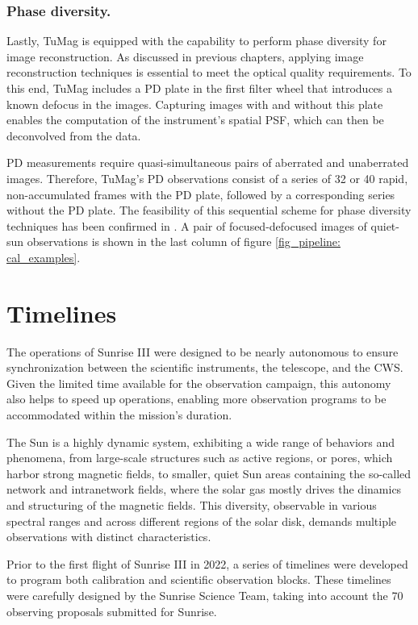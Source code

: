 \subsubsection{\label{susec: PD_measurements}Phase diversity.}

Lastly, TuMag is equipped with the capability to perform phase diversity for image reconstruction. As discussed in previous chapters, applying image reconstruction techniques is essential to meet the optical quality requirements. To this end, TuMag includes a PD plate in the first filter wheel that introduces a known defocus in the images. Capturing images with and without this plate enables the computation of the instrument's spatial PSF, which can then be deconvolved from the data.

PD measurements require quasi-simultaneous pairs of aberrated and unaberrated images. Therefore, TuMag's PD observations consist of a series of 32 or 40 rapid, non-accumulated frames with the PD plate, followed by a corresponding series without the PD plate. The feasibility of this sequential scheme for phase diversity techniques has been confirmed in \cite{PD_sequential}. A pair of focused-defocused images of quiet-sun observations is shown in the last column of figure \ref{fig_pipeline: cal_examples}.

\section{Timelines}

The operations of Sunrise III were designed to be nearly autonomous to ensure synchronization between the scientific instruments, the telescope, and the CWS. Given the limited time available for the observation campaign, this autonomy also helps to speed up operations, enabling more observation programs to be accommodated within the mission's duration.

The Sun is a highly dynamic system, exhibiting a wide range of behaviors and phenomena, from large-scale structures such as active regions, or pores, which harbor strong magnetic fields, to smaller, quiet Sun areas containing the so-called network and intranetwork fields, where the solar gas mostly drives the dinamics and structuring of the magnetic fields. This diversity, observable in various spectral ranges and across different regions of the solar disk, demands multiple observations with distinct characteristics.

Prior to the first flight of Sunrise III in 2022, a series of timelines were developed to program both calibration and scientific observation blocks. These timelines were carefully designed by the Sunrise Science Team, taking into account the 70 observing proposals submitted for Sunrise.

